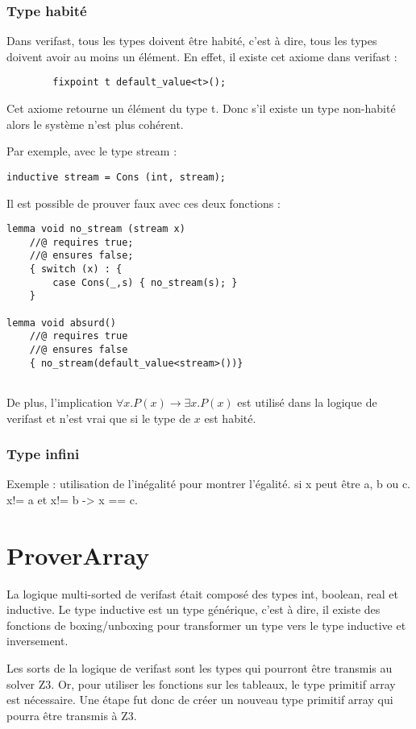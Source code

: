\documentclass[9pt]{book}
\begin{document}
			\subsubsection{Type habit\'e}
				Dans verifast, tous les types doivent \^etre habit\'e, c'est \`a dire, tous les types doivent avoir au moins un \'el\'ement. En effet, il existe cet axiome dans verifast :  
		\begin{lstlisting}
		fixpoint t default_value<t>();
		\end{lstlisting}
		Cet axiome retourne un \'el\'ement du type t. Donc s'il existe un type non-habit\'e alors le syst\`eme n'est plus coh\'erent. \par
		Par exemple, avec le type stream : 
\begin{lstlisting}
inductive stream = Cons (int, stream);
\end{lstlisting}
Il est possible de prouver faux avec ces deux fonctions :
\begin{lstlisting}	
lemma void no_stream (stream x)
	//@ requires true;
	//@ ensures false;
	{ switch (x) : {
		case Cons(_,s) { no_stream(s); }
	}
				
lemma void absurd()
	//@ requires true
	//@ ensures false
	{ no_stream(default_value<stream>())}
				
		\end{lstlisting}
\par De plus, l'implication 
				$\forall x. P(x) \rightarrow \exists x. P(x)$ est utilis\'e dans la logique de verifast et n'est vrai que si le type de $x$ est habit\'e.
			\subsubsection{Type infini}
				Exemple : utilisation de l'in\'egalit\'e pour montrer l'\'egalit\'e. si x peut \^etre a, b ou c. x!= a et x!= b -> x == c.
				
	\section{ProverArray}
		La logique multi-sorted de verifast \'etait compos\'e des types int, boolean, real et inductive. Le type inductive est un type g\'en\'erique, c'est \`a dire, il existe des fonctions de boxing/unboxing pour transformer un type vers le type inductive et inversement. \par
		Les sorts de la logique de verifast sont les types qui pourront \^etre transmis au solver Z3. Or, pour utiliser les fonctions sur les tableaux, le type primitif array est n\'ecessaire. Une \'etape fut donc de cr\'eer un nouveau type primitif array qui pourra \^etre transmis \`a Z3.\par
\end{document}
